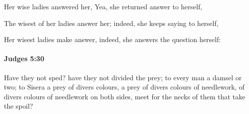 			\begin{versebox}
					\item[BHS] 
					\item[ASV] Her wise ladies answered her, Yea, she returned answer to herself,
					\item[NIV] The wisest of her ladies answer her; indeed, she keeps saying to herself,
					\item[NRSV] Her wisest ladies make answer, indeed, she answers the question herself:
			\end{versebox}

		\paragraph{Judges 5:30} %
			\label{JUDGES-5-30}

			Have they not sped? have they not divided the prey; to every man a damsel or two; to Sisera a prey of divers colours, a prey of divers colours of needlework, of divers colours of needlework on both sides, meet for the necks of them that take the spoil?

